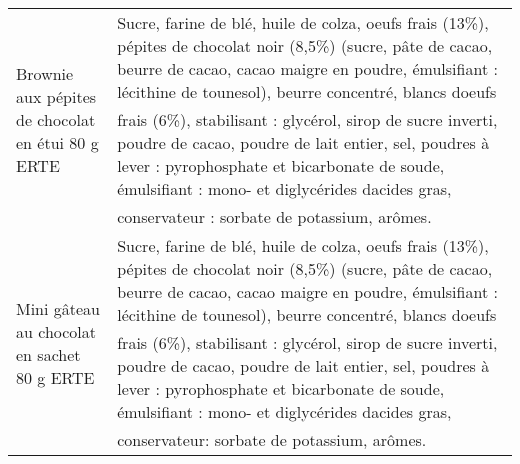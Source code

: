 \begin{longtable}{p{5cm}p{10cm}}
                                                        Brownie aux pépites de chocolat en étui 80 g ERTE &                                                                                                                                                                                                                                                                                                                                                                                                                                                                                                                                        Sucre, farine de blé, huile de colza, oeufs frais (13\%), pépites de chocolat noir (8,5\%) (sucre, pâte de cacao, beurre de cacao, cacao maigre en poudre, émulsifiant : lécithine de tounesol), beurre concentré, blancs doeufs frais (6\%), stabilisant : glycérol, sirop de sucre inverti, poudre de cacao, poudre de lait entier, sel, poudres à lever : pyrophosphate et bicarbonate de soude, émulsifiant : mono- et diglycérides dacides gras, conservateur : sorbate de potassium, arômes. \\
                                                              Mini gâteau au chocolat en sachet 80 g ERTE &                                                                                                                                                                                                                                                                                                                                                                                                                                                                                                                                         Sucre, farine de blé, huile de colza, oeufs frais (13\%), pépites de chocolat noir (8,5\%) (sucre, pâte de cacao, beurre de cacao, cacao maigre en poudre, émulsifiant : lécithine de tounesol), beurre concentré, blancs doeufs frais (6\%), stabilisant : glycérol, sirop de sucre inverti, poudre de cacao, poudre de lait entier, sel, poudres à lever : pyrophosphate et bicarbonate de soude, émulsifiant : mono- et diglycérides dacides gras, conservateur: sorbate de potassium, arômes. \\

\end{longtable}
